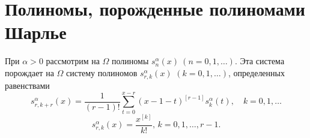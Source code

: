 


\section{Полиномы, порожденные полиномами Шарлье}

При $\alpha>0$ рассмотрим на $\Omega$ полиномы $s_n^\alpha(x)\ (n=0,1,\ldots)$. Эта система порождает на $\Omega$ систему полиномов $s_{r,k}^{\alpha}(x)$ $(k=0, 1,\ldots)$, определенных равенствами
\begin{equation}\label{charlier-Shar_eq19}
s_{r,k+r}^{\alpha}(x)=\frac{1}{(r-1)!} \sum_{t=0}^{x-r}(x-1-t)^{[r-1]}s_{k}^{\alpha}(t), \quad k=0,1,\ldots
\end{equation}
\begin{equation}\label{charlier-Shar_eq20}
s_{r,k}^{\alpha}(x)=\frac{x^{[k]}}{k!},\, k=0,1,\ldots,r-1.
\end{equation}


